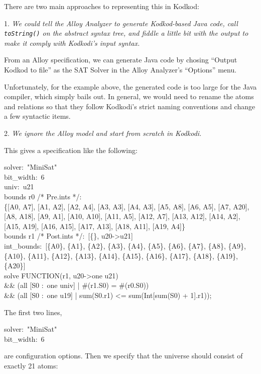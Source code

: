 \documentclass[a4paper,12pt]{article}
\begin{document}
There are two main approaches to representing this in Kodkod:

\begin{enum}
\item[1.] \textsl{We could tell the Alloy Analyzer to generate Kodkod-based Java
code, call \texttt{\textsl{toString()}} on the abstract syntax tree, and fiddle
a little bit with the output to make it comply with Kodkodi's input syntax.}

From an Alloy specification, we can generate Java code by chosing ``Output
Kodkod to file'' as the SAT Solver in the Alloy Analyzer's ``Options'' menu.

Unfortunately, for the example above, the generated code is too large for the
Java compiler, which simply bails out. In general, we would need to rename the
atoms and relations so that they follow Kodkodi's strict naming conventions and
change a few syntactic items.

\item[2.]
\textsl{We ignore the Alloy model and start from scratch in Kodkodi.}

This gives a specification like the following:

\pre
\ttfamily\small
solver:~"MiniSat" \\
bit\_width:~6 \\
univ:~u21 \\
bounds r0 /* Pre.ints */: \\
\{[A0, A7], [A1, A2], [A2, A4], [A3, A3], [A4, A3], [A5, A8], [A6, A5],
 [A7, A20], [A8, A18], [A9, A1], [A10, A10], [A11, A5], [A12, A7], [A13, A12],
 [A14, A2], [A15, A19], [A16, A15], [A17, A13], [A18, A11], [A19, A4]\} \\
bounds r1 /* Post.ints */:~[\{\}, u20->u21] \\
int\_bounds:~[\{A0\}, \{A1\}, \{A2\}, \{A3\}, \{A4\}, \{A5\}, \{A6\}, \{A7\},
\{A8\}, \{A9\}, \{A10\}, \{A11\}, \{A12\}, \{A13\}, \{A14\}, \{A15\}, \{A16\},
\{A17\}, \{A18\}, \{A19\}, \{A20\}] \\
solve FUNCTION(r1, u20->one u21) \\
\&\& (all [S0 :~one univ] | \#(r1.S0) = \#(r0.S0)) \\
\&\& (all [S0 :~one u19] | sum(S0.r1) <= sum(Int[sum(S0) + 1].r1));
\post

The first two lines,

\pre
\ttfamily\small
solver:~"MiniSat" \\
bit\_width:~6
\post

are configuration options. Then we specify that the universe should consist of
exactly 21 atoms:


\end{enum}
\end{document}
